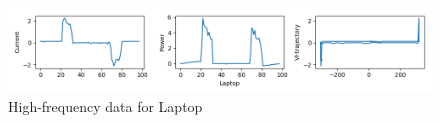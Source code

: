 \begin{figure} 
	\centering
	\includegraphics[width=1\linewidth]{images/Laptop10A1}
	\caption[High-frequency data for Laptop]{High-frequency data for Laptop}
	\label{fig:Laptop10A1}
\end{figure}
